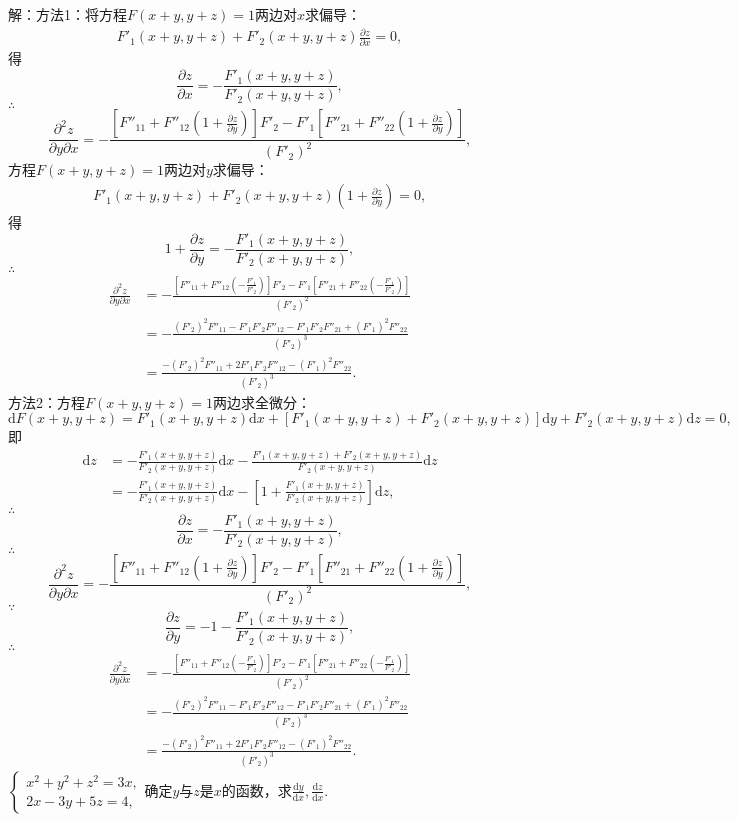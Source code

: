 \documentclass[12pt,UTF8]{ctexart}
\begin{document}
\begin{enumerate}
解：方法1：将方程$F(x+y,y+z)=1$两边对$x$求偏导：
\[\begin{split}
F'_1(x+y,y+z)+F'_2(x+y,y+z)\frac{\partial z}{\partial x}=0,
\end{split}\]
得
\[
\frac{\partial z}{\partial x}=-\frac{F'_1(x+y,y+z)}{F'_2(x+y,y+z)},
\]
$\therefore$
\[
\frac{\partial^2z}{\partial y\partial x}=-\frac{[F''_{11}+F''_{12}(1+\frac{\partial z}{\partial y})]F'_2-F'_1[F''_{21}+F''_{22}(1+\frac{\partial z}{\partial y})]}{(F'_2)^2},
\]
方程$F(x+y,y+z)=1$两边对$y$求偏导：
\[\begin{split}
F'_1(x+y,y+z)+F'_2(x+y,y+z)(1+\frac{\partial z}{\partial y})=0,
\end{split}\]
得
\[
1+\frac{\partial z}{\partial y}=-\frac{F'_1(x+y,y+z)}{F'_2(x+y,y+z)},
\]
$\therefore$
\[\begin{split}
\frac{\partial^2z}{\partial y\partial x}&=-\frac{[F''_{11}+F''_{12}(-\frac{F'_1}{F'_2})]F'_2-F'_1[F''_{21}+F''_{22}(-\frac{F'_1}{F'_2})]}{(F'_2)^2}\\
&=-\frac{(F'_2)^2F''_{11}-F'_1F'_2F''_{12}-F'_1F'_2F''_{21}+(F'_1)^2F''_{22}}{(F'_2)^3}\\
&=\frac{-(F'_2)^2F''_{11}+2F'_1F'_2F''_{12}-(F'_1)^2F''_{22}}{(F'_2)^3}.
\end{split}\]
方法2：方程$F(x+y,y+z)=1$两边求全微分：
\[
\mathrm dF(x+y,y+z)=F'_1(x+y,y+z)\mathrm dx+[F'_1(x+y,y+z)+F'_2(x+y,y+z)]\mathrm dy+F'_2(x+y,y+z)\mathrm dz=0,
\]
即
\[\begin{split}
\mathrm dz&=-\frac{F'_1(x+y,y+z)}{F'_2(x+y,y+z)}\mathrm dx-\frac{F'_1(x+y,y+z)+F'_2(x+y,y+z)}{F'_2(x+y,y+z)}\mathrm dz\\
&=-\frac{F'_1(x+y,y+z)}{F'_2(x+y,y+z)}\mathrm dx-[1+\frac{F'_1(x+y,y+z)}{F'_2(x+y,y+z)}]\mathrm dz,
\end{split}\]
$\therefore$
\[
\frac{\partial z}{\partial x}=-\frac{F'_1(x+y,y+z)}{F'_2(x+y,y+z)},
\]
$\therefore$
\[
\frac{\partial^2z}{\partial y\partial x}=-\frac{[F''_{11}+F''_{12}(1+\frac{\partial z}{\partial y})]F'_2-F'_1[F''_{21}+F''_{22}(1+\frac{\partial z}{\partial y})]}{(F'_2)^2},
\]
$\because$
\[
\frac{\partial z}{\partial y}=-1-\frac{F'_1(x+y,y+z)}{F'_2(x+y,y+z)},
\]
$\therefore$
\[\begin{split}
\frac{\partial^2z}{\partial y\partial x}&=-\frac{[F''_{11}+F''_{12}(-\frac{F'_1}{F'_2})]F'_2-F'_1[F''_{21}+F''_{22}(-\frac{F'_1}{F'_2})]}{(F'_2)^2}\\
&=-\frac{(F'_2)^2F''_{11}-F'_1F'_2F''_{12}-F'_1F'_2F''_{21}+(F'_1)^2F''_{22}}{(F'_2)^3}\\
&=\frac{-(F'_2)^2F''_{11}+2F'_1F'_2F''_{12}-(F'_1)^2F''_{22}}{(F'_2)^3}.
\end{split}\]
$\begin{cases}
x^2+y^2+z^2=3x,\\
2x-3y+5z=4,
\end{cases}$确定$y$与$z$是$x$的函数，求$\frac{\mathrm dy}{\mathrm dx},\frac{\mathrm dz}{\mathrm dx}$.


\end{enumerate}
\end{document}
